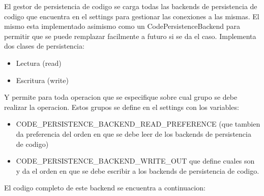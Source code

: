 El gestor de persistencia de codigo se carga todas las backends de persistencia de codigo que encuentra en el settings para gestionar las conexiones a las mismas. El mismo esta implementado asimismo como un CodePersistenceBackend para permitir que se puede remplazar facilmente a futuro si se da el caso. Implementa dos clases de persistencia:
\begin{itemize}
	\item Lectura (read)
	\item Escritura (write) 
\end{itemize}
Y permite para toda operacion que se especifique sobre cual grupo se debe realizar la operacion. Estos grupos se define en el settings con los variables:
\begin{itemize}
	\item CODE\_PERSISTENCE\_BACKEND\_READ\_PREFERENCE (que tambien da preferencia del orden en que se debe leer de los backends de persistencia de codigo)
	\item CODE\_PERSISTENCE\_BACKEND\_WRITE\_OUT que define cuales son y da el orden en que se debe escribir a los backends de persistencia de codigo.
\end{itemize}
El codigo completo de este backend se encuentra a continuacion:
\lstset{language=Python}
